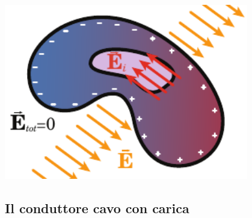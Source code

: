 \begin{minipage}{0.43\textwidth}
\begin{center}
	\includegraphics[width=0.8\textwidth]{images/chp4/chp4condcavocampoind.pdf}
\end{center}
\end{minipage}
\subsection{Il conduttore cavo con carica}
